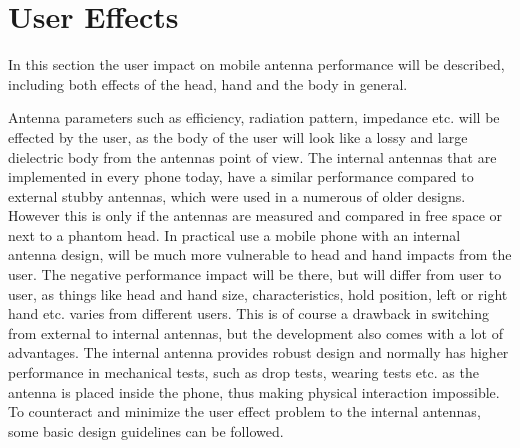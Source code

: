 \section{User Effects}
\label{se:user_effects}
In this section the user impact on mobile antenna performance will be described, including both effects of the head, hand and the body in general.


Antenna parameters such as efficiency, radiation pattern, impedance etc. will be effected by the user, as the body of the user will look like a lossy and large dielectric body from the antennas point of view. 
The internal antennas that are implemented in every phone today, have a similar performance compared to external stubby antennas, which were used in a numerous of older designs. However this is only if the antennas are measured and compared in free space or next to a phantom head. In practical use a mobile phone with an internal antenna design, will be much more vulnerable to head and hand impacts from the user. The negative performance impact will be there, but will differ from user to user, as things like head and hand size, characteristics, hold position, left or right hand etc. varies from different users. This is of course a drawback in switching from external to internal antennas, but the development also comes with a lot of advantages. The internal antenna provides robust design and normally has higher performance in mechanical tests, such as drop tests, wearing tests etc. as the antenna is placed inside the phone, thus making physical interaction impossible. 
To counteract and minimize the user effect problem to the internal antennas, some basic design guidelines can be followed.

